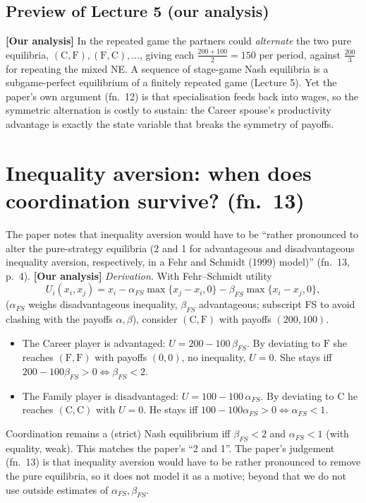 \documentclass[11pt,a4paper]{article}
\newcommand{\answer}[1]{\begin{tcolorbox}[colback=ans!5,colframe=ans,boxrule=0.6pt,
  left=5pt,right=5pt,top=3pt,bottom=3pt]#1\end{tcolorbox}}
\newcommand{\ours}{\textcolor{warn}{\textbf{[Our analysis]}}}
\newcommand{\C}{\mathrm{C}}
\newcommand{\Fm}{\mathrm{F}}
\begin{document}
\subsection{Preview of Lecture 5 (our analysis)}
\ours{} In the repeated game the partners could \emph{alternate} the two pure equilibria,
$(\C,\Fm),(\Fm,\C),\dots$, giving each $\tfrac{200+100}{2}=150$ per period, against $\tfrac{200}{3}$
for repeating the mixed NE. A sequence of stage-game Nash equilibria is a subgame-perfect equilibrium
of a finitely repeated game (Lecture 5). Yet the paper's own argument (fn.~12) is that specialisation
feeds back into wages, so the symmetric alternation is costly to sustain: the Career spouse's
productivity advantage is exactly the state variable that breaks the symmetry of payoffs.

\section{Inequality aversion: when does coordination survive? (fn.~13)}

The paper notes that inequality aversion would have to be ``rather pronounced to alter the
pure-strategy equilibria (2 and 1 for advantageous and disadvantageous inequality aversion,
respectively, in a Fehr and Schmidt (1999) model)'' (fn.~13, p.~4). \ours{} \emph{Derivation.} With
Fehr--Schmidt utility
\[
U_i(x_i,x_j)=x_i-\alpha_{FS}\max\{x_j-x_i,0\}-\beta_{FS}\max\{x_i-x_j,0\},
\]
($\alpha_{FS}$ weighs disadvantageous inequality, $\beta_{FS}$ advantageous; subscript FS to avoid
clashing with the payoffs $\alpha,\beta$), consider $(\C,\Fm)$ with payoffs $(200,100)$.
\begin{itemize}
  \item The Career player is advantaged: $U=200-100\,\beta_{FS}$. By deviating to $\Fm$ she reaches
    $(\Fm,\Fm)$ with payoffs $(0,0)$, no inequality, $U=0$. She stays iff $200-100\beta_{FS}>0\iff
    \beta_{FS}<2$.
  \item The Family player is disadvantaged: $U=100-100\,\alpha_{FS}$. By deviating to $\C$ he reaches
    $(\C,\C)$ with $U=0$. He stays iff $100-100\alpha_{FS}>0\iff\alpha_{FS}<1$.
\end{itemize}
\answer{Coordination remains a (strict) Nash equilibrium iff $\beta_{FS}<2$ and $\alpha_{FS}<1$ (with
equality, weak). This matches the paper's ``2 and 1''. The paper's judgement (fn.~13) is that inequality aversion would have to be
rather pronounced to remove the pure equilibria, so it does not model it as a motive; beyond that
we do not use outside estimates of $\alpha_{FS},\beta_{FS}$.}
\end{document}
